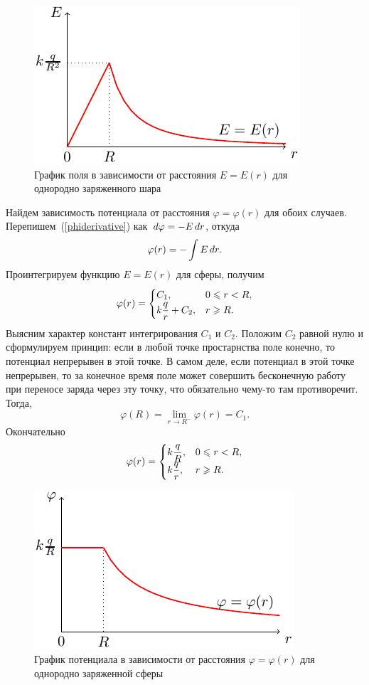 	\begin{figure}[t]
		\centering
		\includegraphics[scale=2]{./img/plot2/plot2.pdf}
		\caption{График поля в зависимости от расстояния $E=E(r)$ для однородно заряженного шара}
	\end{figure}
	Найдем зависимость потенциала от расстояния $\varphi=\varphi(r)$ для обоих случаев. Перепишем~(\ref{phiderivative}) как $\,d \varphi=-E\,d r$, откуда
	\begin{equation}
		\varphi(r)=-\int E\,d r.
	\end{equation}
	Проинтегрируем функцию $E=E(r)$ для сферы, получим
	\begin{equation}
		\varphi(r)=\begin{cases}
						C_1,& \text{$0\leqslant r<R$},\\
						k\dfrac{q}{r} + C_2,& \text{$r\geqslant R$}.
					\end{cases}
	\end{equation}
	Выясним характер констант интегрирования $C_1$ и $C_2$. Положим $C_2$ равной нулю и сформулируем принцип: если в любой точке простарнства поле конечно, то потенциал непрерывен в этой точке. В самом деле, если потенциал в этой точке непрерывен, то за конечное время поле может совершить бесконечную работу при переносе заряда через эту точку, что обязательно чему-то там противоречит. Тогда,
		$$\varphi(R)=\lim_{r\rightarrow R^-} \varphi(r)=C_1.$$
	Окончательно
	\begin{equation}
		\varphi(r)=\begin{cases}
						k\dfrac{q}{R},& \text{$0\leqslant r<R$},\\
						k\dfrac{q}{r},& \text{$r\geqslant R$}.
					\end{cases}
	\end{equation}
	\begin{figure}[t]
		\centering
		\includegraphics[scale=2]{./img/plot3/plot3.pdf}
		\caption{График потенциала в зависимости от расстояния $\varphi=\varphi(r)$ для однородно заряженной сферы}
	\end{figure}
